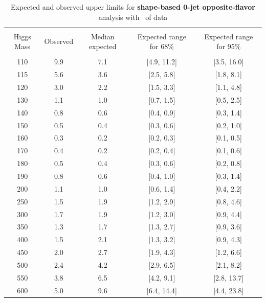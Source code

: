\begin{table}[!hbp]
\begin{center}
\begin{tabular}{c c c c c}
\hline
\vspace{-3mm} && \\
 Higgs Mass   & Observed & Median expected & Expected range for 68\% & Expected range for 95\%   \\
\vspace{-3mm} && \\
\hline
110 & 9.9 & 7.1 & [4.9, 11.2] & [3.5, 16.0] \\
115 & 5.6 & 3.6 & [2.5, 5.8] & [1.8, 8.1] \\
120 & 3.0 & 2.2 & [1.5, 3.3] & [1.1, 4.8] \\
130 & 1.1 & 1.0 & [0.7, 1.5] & [0.5, 2.5] \\
140 & 0.8 & 0.6 & [0.4, 0.9] & [0.3, 1.4] \\
150 & 0.5 & 0.4 & [0.3, 0.6] & [0.2, 1.0] \\
160 & 0.3 & 0.2 & [0.2, 0.3] & [0.1, 0.5] \\
170 & 0.4 & 0.2 & [0.2, 0.4] & [0.1, 0.6] \\
180 & 0.5 & 0.4 & [0.3, 0.6] & [0.2, 0.8] \\
190 & 0.8 & 0.6 & [0.4, 1.0] & [0.3, 1.4] \\
200 & 1.1 & 1.0 & [0.6, 1.4] & [0.4, 2.2] \\
250 & 1.5 & 1.9 & [1.2, 2.9] & [0.8, 4.6] \\
300 & 1.7 & 1.9 & [1.2, 3.0] & [0.9, 4.4] \\
350 & 1.3 & 1.7 & [1.3, 2.7] & [0.9, 3.6] \\
400 & 1.5 & 2.1 & [1.3, 3.2] & [0.9, 4.3] \\
450 & 2.0 & 2.7 & [1.9, 4.3] & [1.2, 6.6] \\
500 & 2.4 & 4.2 & [2.9, 6.5] & [2.1, 8.2] \\
550 & 3.8 & 6.5 & [4.2, 9.1] & [2.8, 13.7] \\
600 & 5.0 & 9.6 & [6.4, 14.4] & [4.4, 23.8] \\
\hline
\end{tabular}
\caption{Expected and observed upper limits for {\bf shape-based 0-jet
    opposite-flavor} analysis with \intlumi\ of data}
\label{tab:of0_cut}
\end{center}
\end{table}

